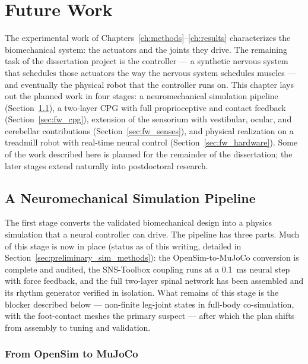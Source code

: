\chapter{Future Work}\label{ch:futurework}
\graphicspath{{../Figures/50-futurework/}}

The experimental work of Chapters~\ref{ch:methods}--\ref{ch:results} characterizes the biomechanical system: the actuators and the joints they drive. The remaining task of the dissertation project is the controller --- a synthetic nervous system that schedules those actuators the way the nervous system schedules muscles --- and eventually the physical robot that the controller runs on. This chapter lays out the planned work in four stages: a neuromechanical simulation pipeline (Section~\ref{sec:fw_pipeline}), a two-layer CPG with full proprioceptive and contact feedback (Section~\ref{sec:fw_cpg}), extension of the sensorium with vestibular, ocular, and cerebellar contributions (Section~\ref{sec:fw_senses}), and physical realization on a treadmill robot with real-time neural control (Section~\ref{sec:fw_hardware}). Some of the work described here is planned for the remainder of the dissertation; the later stages extend naturally into postdoctoral research.

\section{A Neuromechanical Simulation Pipeline}\label{sec:fw_pipeline}

The first stage converts the validated biomechanical design into a physics simulation that a neural controller can drive. The pipeline has three parts. Much of this stage is now in place (status as of this writing, detailed in Section~\ref{sec:preliminary_sim_methods}): the OpenSim-to-MuJoCo conversion is complete and audited, the SNS-Toolbox coupling runs at a \qty{0.1}{\milli\second} neural step with force feedback, and the full two-layer spinal network has been assembled and its rhythm generator verified in isolation. What remains of this stage is the blocker described below --- non-finite leg-joint states in full-body co-simulation, with the foot-contact meshes the primary suspect --- after which the plan shifts from assembly to tuning and validation.

\subsection{From OpenSim to MuJoCo}

